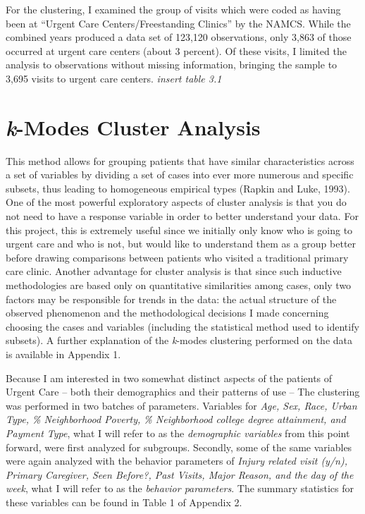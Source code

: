 \documentclass[12pt,twoside]{reedthesis}
\begin{document}
  For the clustering, I examined the group of visits which were coded as
  having been at ``Urgent Care Centers/Freestanding Clinics'' by the
  NAMCS. While the combined years produced a data set of 123,120
  observations, only 3,863 of those occurred at urgent care centers (about
  3 percent). Of these visits, I limited the analysis to observations
  without missing information, bringing the sample to 3,695 visits to
  urgent care centers. \emph{insert table 3.1}
  
  \section*{\emph{k}-Modes Cluster
  Analysis}\label{k-modes-cluster-analysis}
  
  This method allows for grouping patients that have similar
  characteristics across a set of variables by dividing a set of cases
  into ever more numerous and specific subsets, thus leading to
  homogeneous empirical types (Rapkin and Luke, 1993). One of the most
  powerful exploratory aspects of cluster analysis is that you do not need
  to have a response variable in order to better understand your data. For
  this project, this is extremely useful since we initially only know who
  is going to urgent care and who is not, but would like to understand
  them as a group better before drawing comparisons between patients who
  visited a traditional primary care clinic. Another advantage for cluster
  analysis is that since such inductive methodologies are based only on
  quantitative similarities among cases, only two factors may be
  responsible for trends in the data: the actual structure of the observed
  phenomenon and the methodological decisions I made concerning choosing
  the cases and variables (including the statistical method used to
  identify subsets). A further explanation of the \emph{k}-modes
  clustering performed on the data is available in Appendix 1.
  
  Because I am interested in two somewhat distinct aspects of the patients
  of Urgent Care -- both their demographics and their patterns of use --
  The clustering was performed in two batches of parameters. Variables for
  \emph{Age, Sex, Race, Urban Type, \% Neighborhood Poverty, \%
  Neighborhood college degree attainment, and Payment Type}, what I will
  refer to as the \emph{demographic variables} from this point forward,
  were first analyzed for subgroups. Secondly, some of the same variables
  were again analyzed with the behavior parameters of \emph{Injury related
  visit (y/n), Primary Caregiver, Seen Before?, Past Visits, Major Reason,
  and the day of the week}, what I will refer to as the \emph{behavior
  parameters}. The summary statistics for these variables can be found in
  Table 1 of Appendix 2.
  
\end{document}
